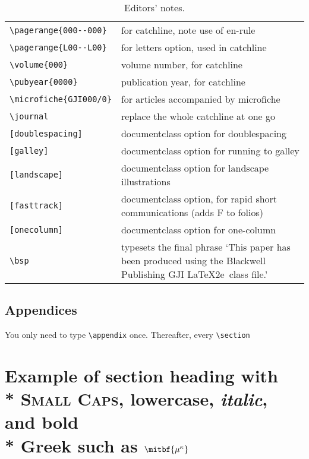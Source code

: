 %
\begin{table*}
\begin{minipage}{130mm}
\caption{Editors' notes.}\label{editors}
\begin{tabular}{@{}lp{270pt}}
\verb"\pagerange{000--000}"& for catchline, note use of en-rule\\
\verb"\pagerange{L00--L00}"& for letters option, used in catchline\\
\verb"\volume{000}" & volume number, for catchline\\
\verb"\pubyear{0000}" & publication year, for catchline\\
\verb"\microfiche{GJI000/0}" & for articles accompanied by microfiche\\
\verb"\journal" & replace the whole catchline at one go\\
\verb"[doublespacing]" & documentclass option for doublespacing\\
\verb"[galley]" & documentclass option for running to galley\\
\verb"[landscape]" & documentclass option for landscape illustrations\\
\verb"[fasttrack]" & documentclass option, for rapid short communications
                   (adds F to folios)\\
\verb"[onecolumn]" & documentclass option for one-column \\
\verb"\bsp"& typesets the final phrase `This paper has been produced
 using the Blackwell Publishing GJI \LaTeX2e\ class file.'\\
\end{tabular}
\end{minipage}
\end{table*}

\subsection{Appendices}

You only need to type \verb"\appendix" once. Thereafter, every \verb"\section"

\section[]{Example of section heading with\\*
  {\mdseries \textsc{S}\lowercase{\textsc{mall}}
  \textsc{C}\lowercase{\textsc{aps}}},
  \lowercase{lowercase},
  \textit{italic}, and bold\\* Greek such as
  $\mitbf{{\mu^\kappa}}$}\label{headings}

